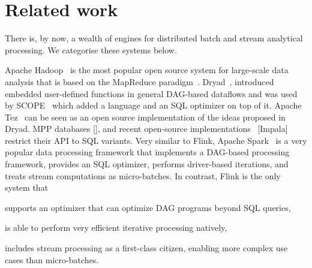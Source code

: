 
\section{Related work}
\label{sec:related}
There is, by now, a wealth of engines for distributed batch and stream analytical processing. We categorise these systems below. 

 Apache Hadoop~\cite{CUSTOM:web/Hadoop} is the most popular open source system for large-scale data analysis that is based on the MapReduce paradigm~\cite{DBLP:journals/cacm/DeanG08}. Dryad~\cite{isard2007dryad}, introduced embedded user-defined functions in general DAG-based dataflows and was used by SCOPE~\cite{scopeOptimizer} which added a language and an SQL optimizer on top of it. Apache Tez~\cite{CUSTOM:web/Tez} can be seen as an open source implementation of the ideas proposed in Dryad. MPP databases [], and recent open-source implementations~\cite{CUSTOM:web/Drill} [Impala] restrict their API to SQL variants. Very similar to Flink, Apache Spark~\cite{CUSTOM:web/Spark} is a very popular data processing framework that implements a DAG-based processing framework, provides an SQL optimizer, performs driver-based iterations, and treats stream computations as micro-batches. In contrast, Flink is the only system that
\begin{inparaenum}[i)]
  \item supports an optimizer that can optimize DAG programs beyond SQL queries,
  \item is able to perform very efficient iterative processing natively,
  \item includes stream processing as a first-class citizen, enabling more complex use cases than micro-batches.
\end{inparaenum}

